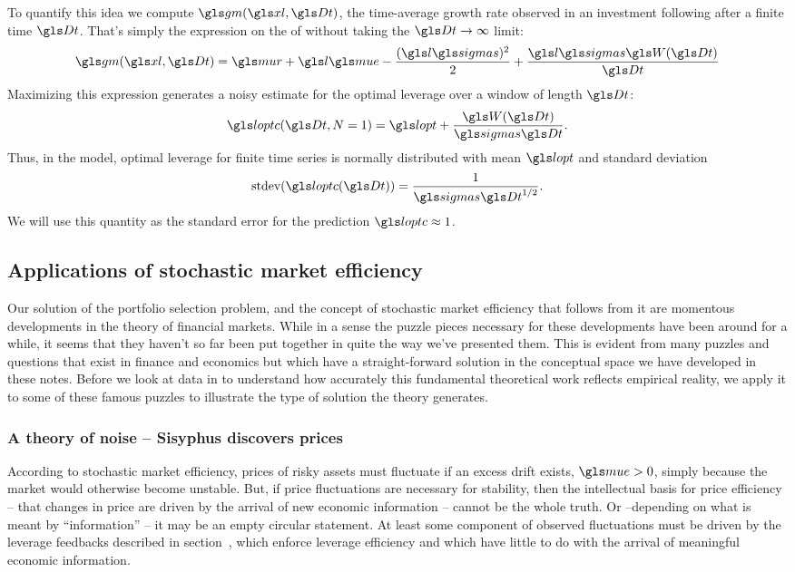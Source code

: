 To quantify this idea we compute $\gm(\xl,\Dt)$, \ie the time-average growth rate observed in an investment following  after a finite
time $\Dt$. That's simply the expression on the \RHS of  without taking the $\Dt\to\infty$ limit:
\begin{equation}
\gm(\xl,\Dt) =
\mur + \l\mue - \frac{(\l\sigmas)^2}{2} + \frac{\l\sigmas \gW(\Dt)}{\Dt}
%
\elabel{g_l_finite}
\end{equation}
Maximizing this expression generates a noisy estimate for the optimal leverage over a window of length $\Dt$:
\begin{equation}
\loptc(\Dt, N=1) = \lopt + \frac{\gW(\Dt)}{\sigmas \Dt}.
\end{equation}
Thus, in the model, optimal leverage for finite time series is
normally distributed with mean $\lopt$ and standard deviation
\begin{equation}
\text{stdev}(\loptc(\Dt)) = \frac{1}{\sigmas \Dt^{1/2}}.
\elabel{variance}
\end{equation}
We will use this quantity as the standard error for the prediction $\loptc\approx1$. 


\subsection{Applications of stochastic market efficiency}
Our solution of the portfolio selection problem, and the concept of stochastic market efficiency that follows from it are momentous developments in the theory of financial markets. While in a sense the puzzle pieces necessary for these developments have been around for a while, it seems that they haven't so far been put together in quite the way we've presented them. This is evident from many puzzles and questions that exist in finance and economics but which have a straight-forward solution in the conceptual space we have developed in these notes. Before we look at data in  to understand how accurately this fundamental theoretical work reflects empirical reality, we apply it to some of these famous puzzles to illustrate the type of solution the theory generates.

\subsubsection{A theory of noise -- Sisyphus discovers prices}
According to stochastic market efficiency, prices of risky assets must fluctuate if an excess drift exists, $\mue>0$, simply because the market would otherwise become unstable. But, if price fluctuations are necessary for stability, then the intellectual basis for price efficiency -- that changes in price are driven by the arrival of new economic information --  cannot be the whole truth. Or  --depending on what is meant by ``information'' -- it may be an empty circular statement. At least some component of observed fluctuations must be driven by the leverage feedbacks described in section~, which enforce leverage efficiency and which have little to do with the arrival of meaningful economic information.

